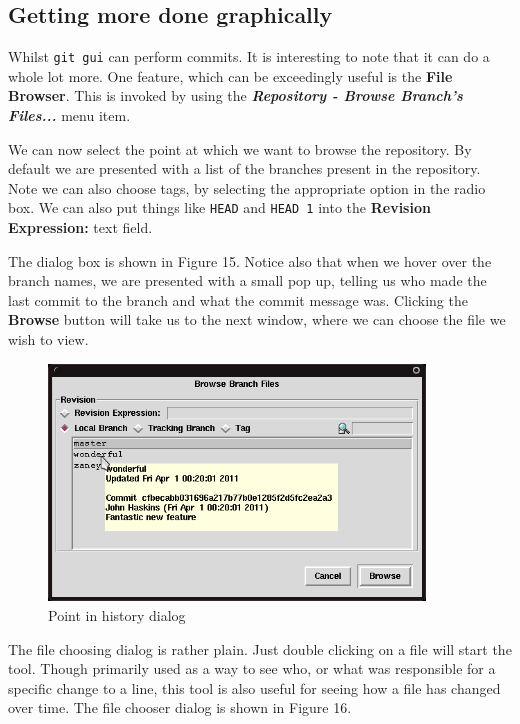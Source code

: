 \subsection{Getting more done graphically}
Whilst \texttt{git gui} can perform commits.
It is interesting to note that it can do a whole lot more.
One feature, which can be exceedingly useful is the \textbf{File Browser}.
This is invoked by using the \textbf{\emph{Repository - Browse Branch's Files...}} menu item.

We can now select the point at which we want to browse the repository.
By default we are presented with a list of the branches present in the repository.
Note we can also choose tags, by selecting the appropriate option in the radio box.
We can also put things like \texttt{HEAD} and \texttt{HEAD~1} into the \textbf{Revision Expression:} text field.

The dialog box is shown in Figure 15.
Notice also that when we hover over the branch names, we are presented with a small pop up, telling us who made the last commit to the branch and what the commit message was.
Clicking the \textbf{Browse} button will take us to the next window, where we can choose the file we wish to view.

\begin{figure}[hbt]
\centering
\includegraphics[width=10cm]{images/f-w5-d15.png}
\caption{Point in history dialog}
\end{figure}

The file choosing dialog is rather plain.
Just double clicking on a file will start the  tool.
Though primarily used as a way to see who, or what was responsible for a specific change to a line, this tool is also useful for seeing how a file has changed over time.
The file chooser dialog is shown in Figure 16.

